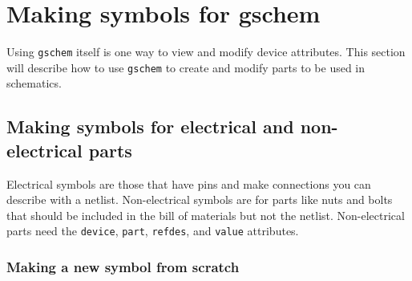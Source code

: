 \section{Making symbols for gschem}
Using \texttt{gschem} itself is one way to view and modify device
attributes.  This section will describe how to use \texttt{gschem} to
create and modify parts to be used in schematics.


\subsection{Making symbols for electrical and non-electrical parts}
Electrical symbols are those that have pins and make connections you
can describe with a netlist.  Non-electrical symbols are for parts
like nuts and bolts that should be included in the bill of materials
but not the netlist.  Non-electrical parts need the \texttt{device},
\texttt{part}, \texttt{refdes}, and \texttt{value} attributes.

\subsubsection{Making a new symbol from scratch}

